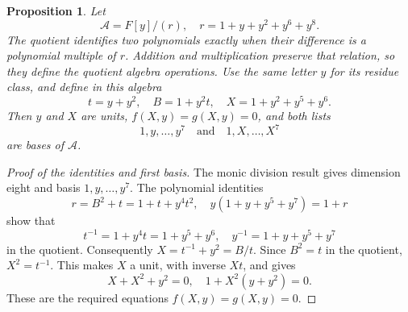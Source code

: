 \documentclass{article}
\newtheorem{proposition}{Proposition}
\begin{document}
\begin{proposition}\label{prop:charge}
  Let
  \begin{equation}
    \mathcal{A}=F[y]/(r), \quad r=1+y+y^2+y^6+y^8.
  \end{equation}
  The quotient identifies two polynomials exactly when their difference is
  a polynomial multiple of \(r\). Addition and multiplication preserve that
  relation, so they define the quotient algebra operations.
  Use the same letter \(y\) for its residue class, and define in this algebra
  \begin{equation}
    t=y+y^2, \quad B=1+y^2t, \quad
    X=1+y^2+y^5+y^6.
  \end{equation}
  Then \(y\) and \(X\) are units, \(f(X,y)=g(X,y)=0\), and both lists
  \begin{equation}
    1,y,\dots,y^7 \quad\text{and}\quad 1,X,\dots,X^7
  \end{equation}
  are bases of \(\mathcal{A}\).
\end{proposition}

\begin{proof}[Proof of the identities and first basis]
%
  The monic division result
  gives dimension eight and basis \(1,y,\dots,y^7\).
  The polynomial identities
  \begin{equation}
    r=B^2+t=1+t+y^4t^2,
    \quad y(1+y+y^5+y^7)=1+r
  \end{equation}
  show that
  \begin{equation}
    t^{-1}=1+y^4t=1+y^5+y^6,
    \quad y^{-1}=1+y+y^5+y^7
  \end{equation}
  in the quotient. Consequently \(X=t^{-1}+y^2=B/t\).
  Since \(B^2=t\) in the quotient,
  \(X^2=t^{-1}\). This makes \(X\) a unit, with inverse \(Xt\), and gives
  \begin{equation}
    X+X^2+y^2=0, \quad 1+X^2(y+y^2)=0.
  \end{equation}
  These are the required equations \(f(X,y)=g(X,y)=0\).
\end{proof}
\end{document}
